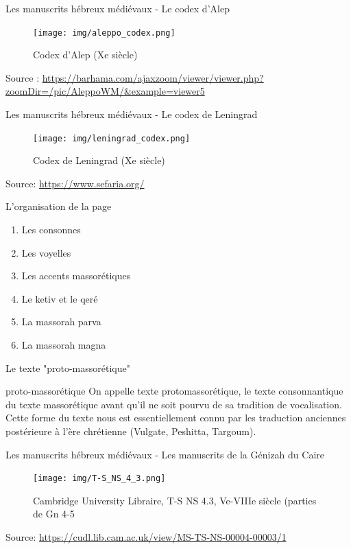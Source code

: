 \documentclass[11pt]{beamer}
\begin{document}
\begin{frame}{Les manuscrits hébreux médiévaux -  Le codex d'Alep}

\begin{figure}
    \centering
    \texttt{[image: img/aleppo\_codex.png]}
    \caption{Codex d'Alep (Xe siècle)}
\end{figure}
\tiny{Source : \href{https://barhama.com/ajaxzoom/viewer/viewer.php?zoomDir=/pic/AleppoWM/&example=viewer5}{https://barhama.com/ajaxzoom/viewer/viewer.php?zoomDir=/pic/AleppoWM/\&example=viewer5}}
\end{frame}

\begin{frame}{Les manuscrits hébreux médiévaux -  Le codex de Leningrad}
\begin{figure}
    \centering
    \texttt{[image: img/leningrad\_codex.png]}
    \caption{Codex de Leningrad (Xe siècle)}
\end{figure}
\tiny{Source: \href{https://www.sefaria.org/}{https://www.sefaria.org/}}
\end{frame}

\begin{frame}{L'organisation de la page}
\begin{block}{}
    \begin{enumerate}
        \item Les consonnes
        \item Les voyelles
        \item Les accents massorétiques
        \item Le ketiv et le qeré
        \item La massorah parva
        \item La massorah magna
    \end{enumerate}    
\end{block}
\end{frame}

\begin{frame}{Le texte "proto-massorétique"}
\begin{alertblock}{proto-massorétique}
    On appelle texte protomassorétique, le texte consonnantique du texte massorétique avant qu'il ne soit pourvu de sa tradition de vocalisation. Cette forme du texte nous est essentiellement connu par les traduction anciennes postérieure à l'ère chrétienne (Vulgate, Peshitta, Targoum).
\end{alertblock}    
\end{frame}

\begin{frame}{Les manuscrits hébreux médiévaux - Les manuscrits de la Génizah du Caire}
    \begin{figure}
        \centering
        \texttt{[image: img/T-S\_NS\_4\_3.png]}
        \caption{Cambridge University Libraire, T-S NS 4.3, Ve-VIIIe siècle (parties de Gn 4-5}
    \end{figure}
    \tiny{Source: \href{https://cudl.lib.cam.ac.uk/view/MS-TS-NS-00004-00003/1}{https://cudl.lib.cam.ac.uk/view/MS-TS-NS-00004-00003/1}}
\end{frame}
\end{document}
